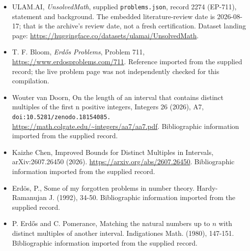 \documentclass[11pt,a4paper]{article}
\begin{document}
{\small

\begin{itemize}

\item[\hypertarget{source:2274:1}{S1}] ULAM.AI, \emph{UnsolvedMath}, supplied \texttt{problems.json}, record 2274 (EP-711), statement and background. The embedded literature-review date is 2026-08-17; that is the archive’s review date, not a fresh certification. Dataset landing page: \url{https://huggingface.co/datasets/ulamai/UnsolvedMath}.

\item[\hypertarget{source:2274:2}{S2}] T. F. Bloom, \emph{Erdős Problems}, Problem 711, \url{https://www.erdosproblems.com/711}. Reference imported from the supplied record; the live problem page was not independently checked for this compilation.

\item[\hypertarget{source:2274:3}{S3}] Wouter van Doorn, On the length of an interval that contains distinct multiples of the first n positive integers, Integers 26 (2026), A7, \nolinkurl{doi:10.5281/zenodo.18154085.} \url{https://math.colgate.edu/~integers/aa7/aa7.pdf}. Bibliographic information imported from the supplied record.

\item[\hypertarget{source:2274:4}{S4}] Kaizhe Chen, Improved Bounds for Distinct Multiples in Intervals, arXiv:2607.26450 (2026). \url{https://arxiv.org/abs/2607.26450}. Bibliographic information imported from the supplied record.

\item[\hypertarget{source:2274:5}{S5}] Erd\"{o}s, P., Some of my forgotten problems in number theory. Hardy-Ramanujan J. (1992), 34-50. Bibliographic information imported from the supplied record.

\item[\hypertarget{source:2274:6}{S6}] P. Erd\H{o}s and C. Pomerance, Matching the natural numbers up to $n$ with distinct multiples of another interval. Indigationes Math. (1980), 147-151. Bibliographic information imported from the supplied record.

\end{itemize}

}

\label{end:2274}
\end{document}
